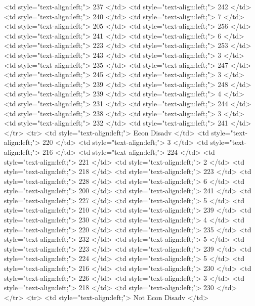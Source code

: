    <td style="text-align:left;"> 237 </td>
   <td style="text-align:left;"> 242 </td>
   <td style="text-align:left;"> 240 </td>
   <td style="text-align:left;"> 7 </td>
   <td style="text-align:left;"> 205 </td>
   <td style="text-align:left;"> 256 </td>
   <td style="text-align:left;"> 241 </td>
   <td style="text-align:left;"> 6 </td>
   <td style="text-align:left;"> 223 </td>
   <td style="text-align:left;"> 253 </td>
   <td style="text-align:left;"> 243 </td>
   <td style="text-align:left;"> 3 </td>
   <td style="text-align:left;"> 235 </td>
   <td style="text-align:left;"> 247 </td>
   <td style="text-align:left;"> 245 </td>
   <td style="text-align:left;"> 3 </td>
   <td style="text-align:left;"> 239 </td>
   <td style="text-align:left;"> 248 </td>
   <td style="text-align:left;"> 239 </td>
   <td style="text-align:left;"> 4 </td>
   <td style="text-align:left;"> 231 </td>
   <td style="text-align:left;"> 244 </td>
   <td style="text-align:left;"> 238 </td>
   <td style="text-align:left;"> 3 </td>
   <td style="text-align:left;"> 232 </td>
   <td style="text-align:left;"> 241 </td>
  </tr>
  <tr>
   <td style="text-align:left;"> Econ Disadv </td>
   <td style="text-align:left;"> 220 </td>
   <td style="text-align:left;"> 3 </td>
   <td style="text-align:left;"> 216 </td>
   <td style="text-align:left;"> 224 </td>
   <td style="text-align:left;"> 221 </td>
   <td style="text-align:left;"> 2 </td>
   <td style="text-align:left;"> 218 </td>
   <td style="text-align:left;"> 223 </td>
   <td style="text-align:left;"> 228 </td>
   <td style="text-align:left;"> 6 </td>
   <td style="text-align:left;"> 200 </td>
   <td style="text-align:left;"> 241 </td>
   <td style="text-align:left;"> 227 </td>
   <td style="text-align:left;"> 5 </td>
   <td style="text-align:left;"> 210 </td>
   <td style="text-align:left;"> 239 </td>
   <td style="text-align:left;"> 230 </td>
   <td style="text-align:left;"> 4 </td>
   <td style="text-align:left;"> 220 </td>
   <td style="text-align:left;"> 235 </td>
   <td style="text-align:left;"> 232 </td>
   <td style="text-align:left;"> 5 </td>
   <td style="text-align:left;"> 223 </td>
   <td style="text-align:left;"> 239 </td>
   <td style="text-align:left;"> 224 </td>
   <td style="text-align:left;"> 5 </td>
   <td style="text-align:left;"> 216 </td>
   <td style="text-align:left;"> 230 </td>
   <td style="text-align:left;"> 226 </td>
   <td style="text-align:left;"> 3 </td>
   <td style="text-align:left;"> 218 </td>
   <td style="text-align:left;"> 230 </td>
  </tr>
  <tr>
   <td style="text-align:left;"> Not Econ Disadv </td>
